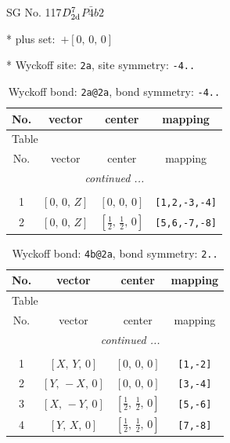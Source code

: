 \documentclass[fleqn,8pt]{jsarticle}
\begin{document}
\setcounter{MaxMatrixCols}{32}

\renewcommand{\tablename}{Table~}
\renewcommand{\figurename}{Figure~}
\begin{center}
\LARGE
SG No. 117\quad$D_{\rm 2d}^{7}$\quad$P\bar{4}b2$\quad[ tetragonal ]
\end{center}

* plus set:\,\,\,$+\left[ 0,\, 0,\, 0 \right]$


* Wyckoff site: {\tt 2a}, site symmetry: {\tt -4..}
\renewcommand{\arraystretch}{1.2}
\begin{longtable}{cccc}
\caption{Wyckoff bond: {\tt 2a@2a}, bond symmetry: {\tt -4..}}
 \\
 \hline \hline
No. & vector & center & mapping \\ \hline \endfirsthead

\multicolumn{3}{l}{\tablename\ \thetable{}} \\
 \hline \hline
No. & vector & center & mapping \\ \hline \endhead

 \hline \hline
\multicolumn{3}{r}{\footnotesize\it continued ...} \\ \endfoot

 \hline \hline
\multicolumn{3}{r}{} \\ \endlastfoot

1 & $\left[ 0,\, 0,\, Z \right]$ & $\left[ 0,\, 0,\, 0 \right]$ & {\tt [1,2,-3,-4]} \\ \hline
2 & $\left[ 0,\, 0,\, Z \right]$ & $\left[ \frac{1}{2},\, \frac{1}{2},\, 0 \right]$ & {\tt [5,6,-7,-8]} \\
\end{longtable}
\renewcommand{\arraystretch}{1.2}
\begin{longtable}{cccc}
\caption{Wyckoff bond: {\tt 4b@2a}, bond symmetry: {\tt 2..}}
 \\
 \hline \hline
No. & vector & center & mapping \\ \hline \endfirsthead

\multicolumn{3}{l}{\tablename\ \thetable{}} \\
 \hline \hline
No. & vector & center & mapping \\ \hline \endhead

 \hline \hline
\multicolumn{3}{r}{\footnotesize\it continued ...} \\ \endfoot

 \hline \hline
\multicolumn{3}{r}{} \\ \endlastfoot

1 & $\left[ X,\, Y,\, 0 \right]$ & $\left[ 0,\, 0,\, 0 \right]$ & {\tt [1,-2]} \\ \hline
2 & $\left[ Y,\, - X,\, 0 \right]$ & $\left[ 0,\, 0,\, 0 \right]$ & {\tt [3,-4]} \\ \hline
3 & $\left[ X,\, - Y,\, 0 \right]$ & $\left[ \frac{1}{2},\, \frac{1}{2},\, 0 \right]$ & {\tt [5,-6]} \\ \hline
4 & $\left[ Y,\, X,\, 0 \right]$ & $\left[ \frac{1}{2},\, \frac{1}{2},\, 0 \right]$ & {\tt [7,-8]} \\
\end{longtable}
\end{document}
